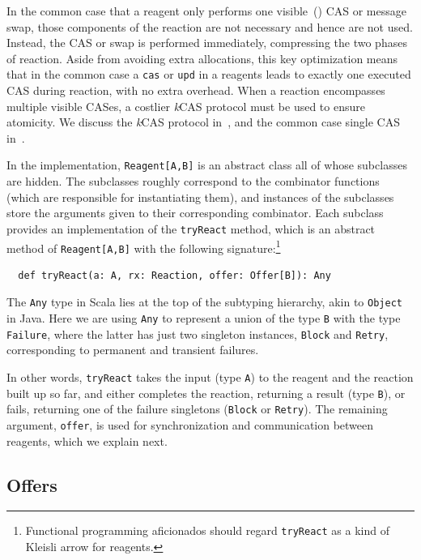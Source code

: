 \documentclass[preprint,nocopyrightspace]{sigplanconf}
\begin{document}
In the common case that a reagent only performs one visible~()
CAS or message swap, those components of the reaction are not necessary and
hence are not used.  Instead, the CAS or swap is performed immediately,
compressing the two phases of reaction.  Aside from avoiding extra allocations,
this key optimization means that in the common case a \lstinline{cas} or
\lstinline{upd} in a reagents leads to exactly one executed CAS during reaction,
with no extra overhead.  When a reaction encompasses multiple visible CASes, a
costlier \emph{k}CAS protocol must be used to ensure atomicity.  We discuss the
\emph{k}CAS protocol in~, and the common case single CAS
in~.

In the implementation, \lstinline{Reagent[A,B]} is an abstract class all of
whose subclasses are hidden.  The subclasses roughly correspond to the
combinator functions (which are responsible for instantiating them), and
instances of the subclasses store the arguments given to their corresponding
combinator.  Each subclass provides an implementation of the
\lstinline{tryReact} method, which is an abstract method of
\lstinline{Reagent[A,B]} with the following signature:\footnote{ Functional
  programming aficionados should regard \lstinline{tryReact} as a kind of
  Kleisli arrow for reagents.}
\begin{lstlisting}
  def tryReact(a: A, rx: Reaction, offer: Offer[B]): Any
\end{lstlisting}
The \lstinline{Any} type in Scala lies at the top of the subtyping hierarchy,
akin to \lstinline{Object} in Java.  Here we are using \lstinline{Any} to
represent a union of the type \lstinline{B} with the type
\lstinline{Failure}, where the latter has just two singleton instances,
\lstinline{Block} and \lstinline{Retry}, corresponding to permanent and
transient failures.  

In other words, \lstinline{tryReact} takes the input (type \lstinline{A}) to
the reagent and the reaction built up so far, and either completes the
reaction, returning a result (type \lstinline{B}), or fails, returning one of
the failure singletons (\lstinline{Block} or \lstinline{Retry}).  The
remaining argument, \lstinline{offer}, is used for synchronization and
communication between reagents, which we explain next.

\subsection{Offers}
\label{sec:offers}
\end{document}
